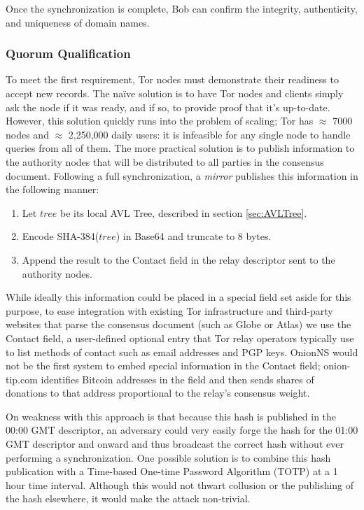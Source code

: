Once the synchronization is complete, Bob can confirm the integrity, authenticity, and uniqueness of domain names.

\subsubsection{Quorum Qualification}

To meet the first requirement, Tor nodes must demonstrate their readiness to accept new records. The na\"{i}ve solution is to have Tor nodes and clients simply ask the node if it was ready, and if so, to provide proof that it's up-to-date. However, this solution quickly runs into the problem of scaling; Tor has $ \approx $ 7000 nodes and $ \approx $ 2,250,000 daily users\cite{TorMetrics}: it is infeasible for any single node to handle queries from all of them. The more practical solution is to publish information to the authority nodes that will be distributed to all parties in the consensus document. Following a full synchronization, a \emph{mirror} publishes this information in the following manner:

\begin{enumerate}
	\item Let $ tree $ be its local AVL Tree, described in section \ref{sec:AVLTree}.
	\item Encode SHA-384($ tree $) in Base64 and truncate to 8 bytes.
	\item Append the result to the Contact field in the relay descriptor sent to the authority nodes.
\end{enumerate}

While ideally this information could be placed in a special field set aside for this purpose, to ease integration with existing Tor infrastructure and third-party websites that parse the consensus document (such as Globe or Atlas) we use the Contact field, a user-defined optional entry that Tor relay operators typically use to list methods of contact such as email addresses and PGP keys. OnionNS would not be the first system to embed special information in the Contact field; onion-tip.com identifies Bitcoin addresses in the field and then sends shares of donations to that address proportional to the relay's consensus weight.

On weakness with this approach is that because this hash is published in the 00:00 GMT descriptor, an adversary could very easily forge the hash for the 01:00 GMT descriptor and onward and thus broadcast the correct hash without ever performing a synchronization. One possible solution is to combine this hash publication with a Time-based One-time Password Algorithm (TOTP) at a 1 hour time interval. Although this would not thwart collusion or the publishing of the hash elsewhere, it would make the attack non-trivial.

